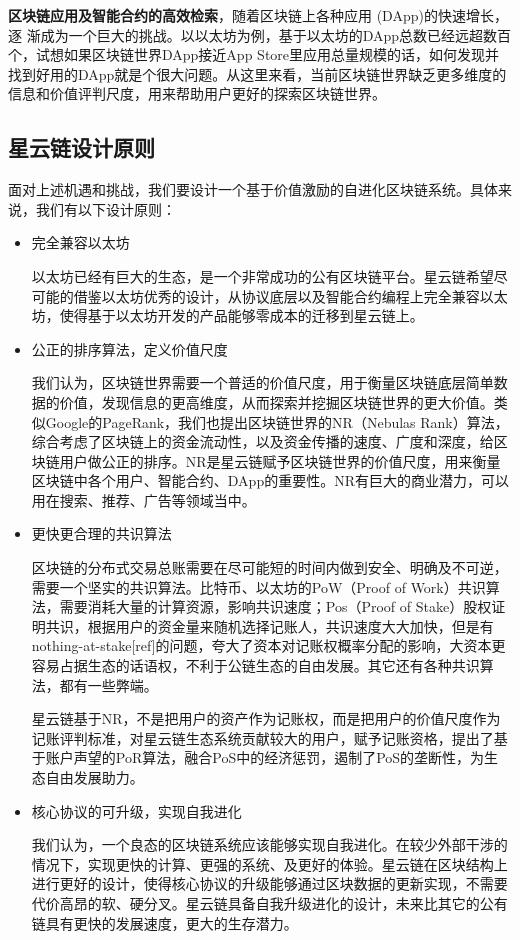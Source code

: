 \textbf{区块链应用及智能合约的高效检索}，随着区块链上各种应用 (DApp)的快速增长，逐 渐成为一个巨大的挑战。以以太坊为例，基于以太坊的DApp总数已经远超数百个，试想如果区块链世界DApp接近App Store里应用总量规模的话，如何发现并找到好用的DApp就是个很大问题。从这里来看，当前区块链世界缺乏更多维度的信息和价值评判尺度，用来帮助用户更好的探索区块链世界。

\subsection{星云链设计原则}
面对上述机遇和挑战，我们要设计一个基于价值激励的自进化区块链系统。具体来说，我们有以下设计原则：
\begin{itemize}
	\item 完全兼容以太坊

	以太坊已经有巨大的生态，是一个非常成功的公有区块链平台。星云链希望尽可能的借鉴以太坊优秀的设计，从协议底层以及智能合约编程上完全兼容以太坊，使得基于以太坊开发的产品能够零成本的迁移到星云链上。
	\item 公正的排序算法，定义价值尺度

	我们认为，区块链世界需要一个普适的价值尺度，用于衡量区块链底层简单数据的价值，发现信息的更高维度，从而探索并挖掘区块链世界的更大价值。类似Google的PageRank，我们也提出区块链世界的NR（Nebulas Rank）算法，综合考虑了区块链上的资金流动性，以及资金传播的速度、广度和深度，给区块链用户做公正的排序。NR是星云链赋予区块链世界的价值尺度，用来衡量区块链中各个用户、智能合约、DApp的重要性。NR有巨大的商业潜力，可以用在搜索、推荐、广告等领域当中。
	\item 更快更合理的共识算法

区块链的分布式交易总账需要在尽可能短的时间内做到安全、明确及不可逆，需要一个坚实的共识算法。比特币、以太坊的PoW（Proof of Work）共识算法，需要消耗大量的计算资源，影响共识速度；Pos（Proof of Stake）股权证明共识，根据用户的资金量来随机选择记账人，共识速度大大加快，但是有nothing-at-stake[ref]的问题，夸大了资本对记账权概率分配的影响，大资本更容易占据生态的话语权，不利于公链生态的自由发展。其它还有各种共识算法，都有一些弊端。

星云链基于NR，不是把用户的资产作为记账权，而是把用户的价值尺度作为记账评判标准，对星云链生态系统贡献较大的用户，赋予记账资格，提出了基于账户声望的PoR算法，融合PoS中的经济惩罚，遏制了PoS的垄断性，为生态自由发展助力。

	\item 核心协议的可升级，实现自我进化

我们认为，一个良态的区块链系统应该能够实现自我进化。在较少外部干涉的情况下，实现更快的计算、更强的系统、及更好的体验。星云链在区块结构上进行更好的设计，使得核心协议的升级能够通过区块数据的更新实现，不需要代价高昂的软、硬分叉。星云链具备自我升级进化的设计，未来比其它的公有链具有更快的发展速度，更大的生存潜力。


\end{itemize}

